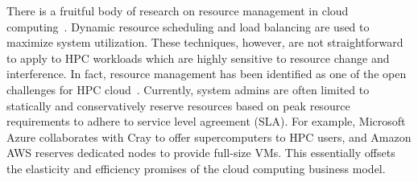 There is a fruitful body of research on resource management in 
cloud computing~\cite{singh2016survey}. Dynamic resource scheduling and 
load balancing are used 
to maximize system utilization. These techniques, however, 
are not straightforward to apply to HPC workloads which are highly sensitive to resource change and interference. 
In fact, resource management has been identified as one of the open 
challenges for HPC cloud~\cite{netto2018hpc}. 
Currently, system admins are often limited to statically and conservatively reserve 
resources based on peak resource requirements to adhere to service level agreement (SLA). For example, Microsoft Azure collaborates with Cray to offer supercomputers to HPC users, 
and Amazon AWS reserves dedicated nodes to provide full-size VMs. 
This essentially offsets 
the elasticity and efficiency promises of the cloud computing business model. 


